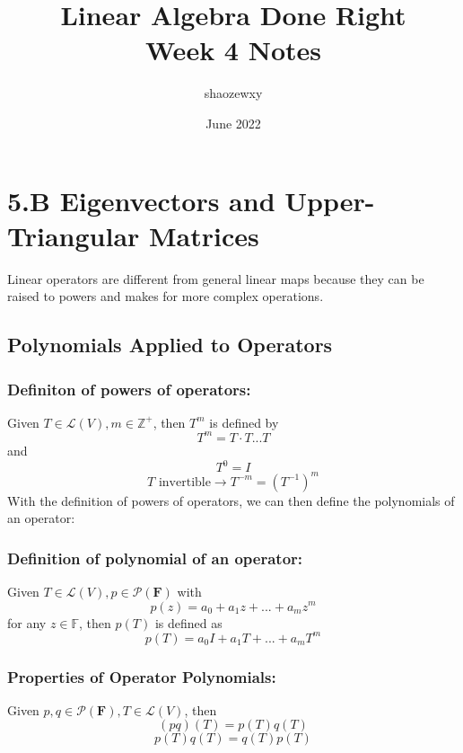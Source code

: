 \documentclass{article}
\title{Linear Algebra Done Right\\
\large{Week 4 Notes}}
\author{shaozewxy }
\date{June 2022}
\begin{document}
\maketitle

\setcounter{secnumdepth}{0}
\section{5.B Eigenvectors and Upper-Triangular Matrices}
Linear operators are different from general linear maps because they can be raised to powers and makes for more complex operations.
\subsection{Polynomials Applied to Operators}
\subsubsection{Definiton of powers of operators:}
Given $T \in \mathcal{L}(V), m \in \mathbb{Z}^+$, then $T^m$ is defined by
\begin{equation*}
    T^m = T\cdot T ... T
\end{equation*}
and
\begin{equation*}
    T^0 = I
\end{equation*}
\begin{equation*}
    T \textrm{ invertible} \rightarrow T^{-m} = (T^{-1})^m
\end{equation*}
With the definition of powers of operators, we can then define the polynomials of an operator:
\subsubsection{Definition of polynomial of an operator:}
Given $T \in \mathcal{L}(V), p \in \mathcal{P}(\mathbf{F})$ with
\begin{equation*}
    p(z) = a_0 + a_1z + ... + a_mz^m
\end{equation*}
for any $z \in \mathbb{F}$, then $p(T)$ is defined as
\begin{equation*}
    p(T) = a_0I + a_1T + ... + a_mT^m
\end{equation*}
\subsubsection{Properties of Operator Polynomials:}
Given $p, q \in \mathcal{P}(\mathbf{F}), T \in \mathcal{L}(V)$, then
\begin{equation*}
    (pq)(T) = p(T)q(T)
\end{equation*}
\begin{equation*}
    p(T)q(T) = q(T)p(T)
\end{equation*}
\end{document}
